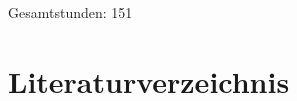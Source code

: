 \documentclass[a4paper,12pt]{report}
\begin{document}
\begin{longtable}[c]{|c|>{\raggedright\arraybackslash}p{2.5cm}|>{\raggedright\arraybackslash}p{7cm}|}
\end{longtable}

Gesamtstunden: 151

\newpage

\chapter*{Literaturverzeichnis}

\printbibliography[heading=none]

\listoffigures
\end{document}

